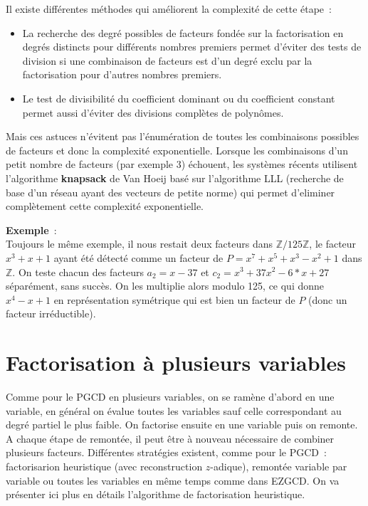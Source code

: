 \documentclass[a4paper,11pt]{book}
\begin{document}
\begin{giacjshere}
Il existe différentes méthodes
qui améliorent la complexité de cette étape~:
\begin{itemize}
\item La recherche des degré possibles de facteurs fondée sur
la factorisation en degrés distincts pour différents nombres premiers 
permet d'éviter des tests de division si une combinaison de facteurs
est d'un degré exclu par la factorisation pour d'autres nombres premiers.
\item Le test de divisibilité du coefficient dominant ou du coefficient
constant permet aussi d'éviter des divisions complètes de polynômes.
\end{itemize}
Mais ces astuces n'évitent pas l'énumération de toutes les combinaisons
possibles de facteurs et donc la complexité exponentielle. Lorsque
les combinaisons d'un petit nombre de facteurs (par exemple 3)
échouent, les systèmes récents utilisent
l'algorithme {\bf knapsack} de Van Hoeij basé sur l'algorithme LLL
(recherche de base d'un réseau ayant des vecteurs de petite norme) 
qui permet d'eliminer complètement cette complexité exponentielle.

{\bf Exemple}~:\\ 
Toujours le même exemple, il nous restait deux
facteurs dans $\mathbb{Z}/125 \mathbb{Z}$, le facteur $x^3+x+1$ ayant été
détecté comme un facteur de $P=x^7+x^5+x^3-x^2+1$ dans $\mathbb{Z}$.
On teste chacun des facteurs  $a_2=x-37$ et $c_2=x^3+37x^2-6*x+27$
séparément, sans succès. On les multiplie alors modulo 125,
ce qui donne $x^4-x+1$ en représentation symétrique qui est bien
un facteur de $P$ (donc un facteur irréductible).

\section{Factorisation à plusieurs variables}
Comme pour le PGCD en plusieurs variables, on se ramène d'abord en
une variable, en général on évalue toutes les variables sauf celle
correspondant au degré partiel le plus faible. On factorise ensuite
en une variable puis on remonte. A chaque étape de remontée, il peut
être à nouveau nécessaire de combiner plusieurs facteurs. Différentes
stratégies existent, comme pour le PGCD~: factorisarion heuristique
(avec reconstruction $z$-adique), remontée variable par variable
ou toutes les variables en même temps comme dans EZGCD.
On va présenter ici plus en détails l'algorithme de factorisation heuristique.


\end{giacjshere}
\end{document}
